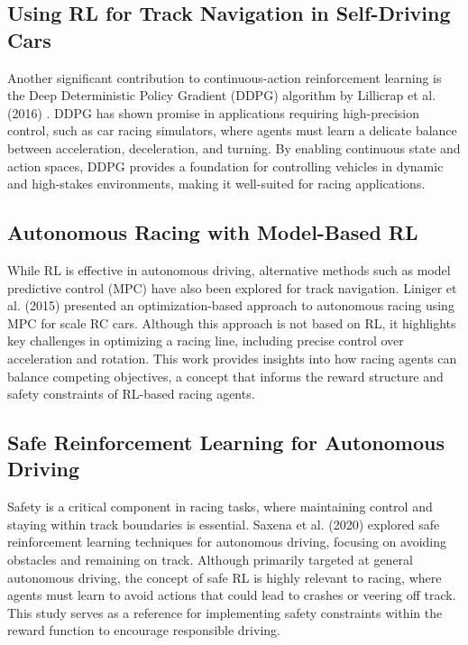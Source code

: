 \documentclass{article}
\begin{document}
\subsection{Using RL for Track Navigation in Self-Driving Cars}
Another significant contribution to continuous-action reinforcement learning is the Deep Deterministic Policy Gradient (DDPG) algorithm by Lillicrap et al. (2016) \cite{lillicrap2015continuous}. DDPG has shown promise in applications requiring high-precision control, such as car racing simulators, where agents must learn a delicate balance between acceleration, deceleration, and turning. By enabling continuous state and action spaces, DDPG provides a foundation for controlling vehicles in dynamic and high-stakes environments, making it well-suited for racing applications.

\subsection{Autonomous Racing with Model-Based RL}
While RL is effective in autonomous driving, alternative methods such as model predictive control (MPC) have also been explored for track navigation. Liniger et al. (2015) \cite{liniger2015optimization} presented an optimization-based approach to autonomous racing using MPC for scale RC cars. Although this approach is not based on RL, it highlights key challenges in optimizing a racing line, including precise control over acceleration and rotation. This work provides insights into how racing agents can balance competing objectives, a concept that informs the reward structure and safety constraints of RL-based racing agents.

\subsection{Safe Reinforcement Learning for Autonomous Driving}
Safety is a critical component in racing tasks, where maintaining control and staying within track boundaries is essential. Saxena et al. (2020) \cite{saxena2020driving} explored safe reinforcement learning techniques for autonomous driving, focusing on avoiding obstacles and remaining on track. Although primarily targeted at general autonomous driving, the concept of safe RL is highly relevant to racing, where agents must learn to avoid actions that could lead to crashes or veering off track. This study serves as a reference for implementing safety constraints within the reward function to encourage responsible driving.
\end{document}
